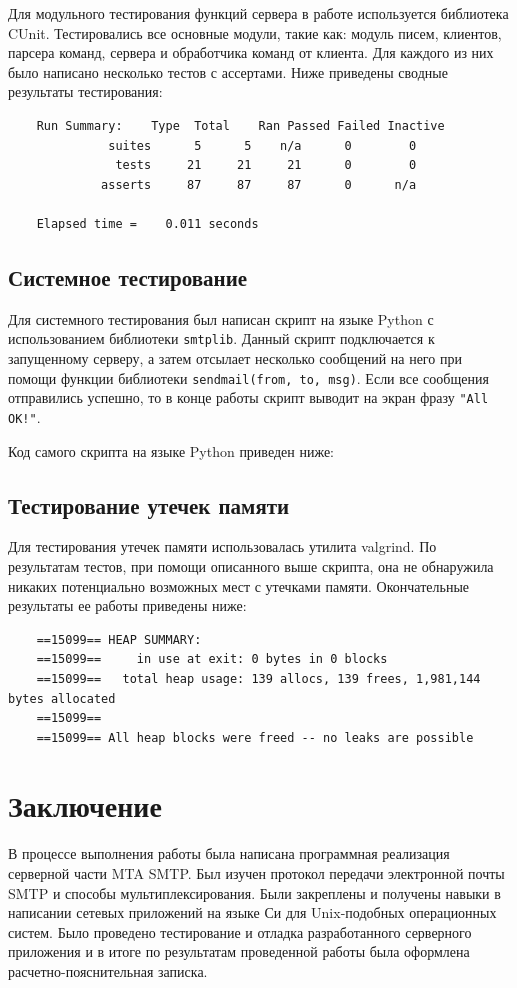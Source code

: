 \documentclass[a4paper,12pt]{report}
\begin{document}
Для модульного тестирования функций сервера в работе используется библиотека CUnit. Тестировались все основные модули, такие как: модуль писем, клиентов, парсера команд, сервера и обработчика команд от клиента. Для каждого из них было написано несколько тестов с ассертами. Ниже приведены сводные результаты тестирования:
\begin{verbatim}
    Run Summary:    Type  Total    Ran Passed Failed Inactive
              suites      5      5    n/a      0        0
               tests     21     21     21      0        0
             asserts     87     87     87      0      n/a

    Elapsed time =    0.011 seconds
\end{verbatim}


\section{Системное тестирование}

Для системного тестирования был написан скрипт на языке Python с использованием библиотеки \texttt{smtplib}. Данный скрипт подключается к запущенному серверу, а затем отсылает несколько сообщений на него при помощи функции библиотеки \texttt{sendmail(from, to, msg)}. Если все сообщения отправились успешно, то в конце работы скрипт выводит на экран фразу \texttt{"All OK!"}.

Код самого скрипта на языке Python приведен ниже:



\section{Тестирование утечек памяти}

Для тестирования утечек памяти использовалась утилита valgrind. По результатам тестов, при помощи описанного выше скрипта, она не обнаружила никаких потенциально возможных мест с утечками памяти. Окончательные результаты ее работы приведены ниже:
\begin{verbatim}
    ==15099== HEAP SUMMARY:
    ==15099==     in use at exit: 0 bytes in 0 blocks
    ==15099==   total heap usage: 139 allocs, 139 frees, 1,981,144 bytes allocated
    ==15099== 
    ==15099== All heap blocks were freed -- no leaks are possible
\end{verbatim}


\clearpage
\chapter*{Заключение}

В процессе выполнения работы была написана программная реализация серверной части MTA SMTP. Был изучен протокол передачи электронной почты SMTP и способы мультиплексирования. Были закреплены и получены навыки в написании сетевых приложений на языке Си для Unix-подобных операционных систем. Было проведено тестирование и отладка разработанного серверного приложения и в итоге по результатам проведенной работы была оформлена расчетно-пояснительная записка.
\end{document}
